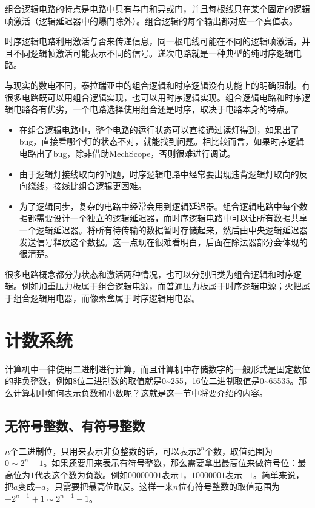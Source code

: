 组合逻辑电路的特点是电路中只有与门和异或门，并且每根线只在某个固定的逻辑帧激活（逻辑延迟器中的爆门除外）。组合逻辑的每个输出都对应一个真值表。

时序逻辑电路利用激活与否来传递信息，同一根电线可能在不同的逻辑帧激活，并且不同逻辑帧激活可能表示不同的信号。递次电路就是一种典型的纯时序逻辑电路。

与现实的数电不同，泰拉瑞亚中的组合逻辑和时序逻辑没有功能上的明确限制。有很多电路既可以用组合逻辑实现，也可以用时序逻辑实现。组合逻辑电路和时序逻辑电路各有优劣，一个电路选择使用组合还是时序，取决于电路本身的特点。
\begin{itemize}
\item 在组合逻辑电路中，整个电路的运行状态可以直接通过读灯得到，如果出了bug，直接看哪个灯的状态不对，就能找到问题。相比较而言，如果时序逻辑电路出了bug，除非借助MechScope，否则很难进行调试。
\item 由于逻辑灯接线取向的问题，时序逻辑电路中经常要出现违背逻辑灯取向的反向绕线，接线比组合逻辑更困难。
\item 为了逻辑同步，复杂的电路中经常会用到逻辑延迟器。组合逻辑电路中每个数据都需要设计一个独立的逻辑延迟器，而时序逻辑电路中可以让所有数据共享一个逻辑延迟器。将所有待传输的数据暂时存储起来，然后由中央逻辑延迟器发送信号释放这个数据。这一点现在很难看明白，后面在除法器部分会体现的很清楚。
\end{itemize}

很多电路概念都分为状态和激活两种情况，也可以分别归类为组合逻辑和时序逻辑。例如加重压力板属于组合逻辑电源，而普通压力板属于时序逻辑电源；火把属于组合逻辑用电器，而像素盒属于时序逻辑用电器。

\section{计数系统}
计算机中一律使用二进制进行计算，而且计算机中存储数字的一般形式是固定数位的非负整数，例如8位二进制数的取值就是0\~{}255，16位二进制取值是0\~{}65535。那么计算机中如何表示负数和小数呢？这就是这一节中将要介绍的内容。

\subsection{无符号整数、有符号整数}
$n$个二进制位，只用来表示非负整数的话，可以表示$2^n$个数，取值范围为$0\sim2^n-1$。如果还要用来表示有符号整数，那么需要拿出最高位来做符号位：最高位为$1$代表这个数为负数。例如$00000001$表示$1$，$10000001$表示$-1$。简单来说，把$a$变成$-a$，只需要把最高位取反。这样一来$n$位有符号整数的取值范围为$-2^{n-1}+1\sim2^{n-1}-1$。

